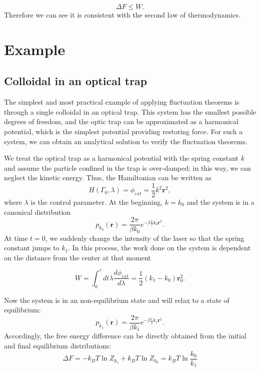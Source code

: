\documentclass[ reprint, amsmath,amssymb, aps,]{revtex4-1}
\begin{document}
\begin{equation}
    \Delta F \leq W.
\end{equation}
Therefore we can see it is consistent with the second law of thermodynamics.
\section{Example}\label{sec:example}
\subsection{Colloidal in an optical trap}
The simplest and most practical example of applying fluctuation theorems is through a single colloidal in an optical trap. This system has the smallest possible degrees of freedom, and the optic trap can be approximated as a harmonical potential, which is the simplest potential providing restoring force. For such a system, we can obtain an analytical solution to verify the fluctuation theorems.

We treat the optical trap as a harmonical potential with the spring constant $k$ and assume the particle confined in the trap is over-damped; in this way, we can neglect the kinetic energy. Thus, the Hamiltonian can be written as
\begin{equation}
    H(\Gamma_0,\lambda)=\phi_{ext}=\frac{1}{2}k^2 \mathbf{r}^2,
\end{equation}
where $\lambda$ is the control parameter. At the beginning, $k=k_0$ and the system is in a canonical distribution 
\begin{equation}\label{eq:collodid_initial_distribution}
p_{k_0}(\mathbf{r})=\frac{2\pi}{\beta k_0}e^{-\beta \frac{1}{2}k_0 \mathbf{r}^2}.
\end{equation}
At time $t=0$, we suddenly change the intensity of the laser so that the spring constant jumps to $k_1$. In this process, the work done on the system is dependent on the distance from the center at that moment

\begin{equation}\label{eq:colloidal_work}
W=\int_0^\tau dt \dot{\lambda}\frac{d\phi_{ext}}{d\lambda}=\frac{1}{2}(k_1-k_0)\mathbf{r}_0^2.
\end{equation}

Now the system is in an non-equilibrium state and will relax to a state of equilibrium: 
\begin{equation}
p_{k_1}(\mathbf{r})=\frac{2\pi}{\beta k_1}e^{-\beta \frac{1}{2}k_1 \mathbf{r}^2}.
\end{equation}
Accordingly, the free energy difference can be directly obtained from the initial and final equilibrium distributions:
\begin{equation}
\Delta F=-k_BT\ln{Z_{k_1}}+k_BT\ln{Z_{k_0}}=k_BT\ln{\frac{k_0}{k_1}}
\end{equation}
\end{document}
